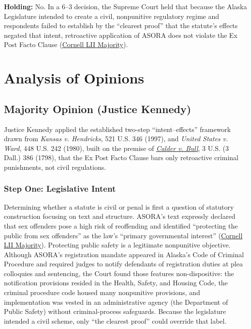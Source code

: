 \documentclass[12pt]{article}
\begin{document}
\textbf{Holding:} No. In a 6--3 decision, the Supreme Court held that because the Alaska Legislature intended to create a civil, nonpunitive regulatory regime and respondents failed to establish by the ``clearest proof'' that the statute's effects negated that intent, retroactive application of ASORA does not violate the Ex Post Facto Clause (\href{https://www.law.cornell.edu/supct/html/01-729.ZO.html}{Cornell LII Majority}).

\section{Analysis of Opinions}
\subsection{Majority Opinion (Justice Kennedy)}

Justice Kennedy applied the established two-step ``intent--effects'' framework drawn from \textit{Kansas v. Hendricks}, 521 U.S. 346 (1997), and \textit{United States v. Ward}, 448 U.S. 242 (1980), built on the premise of \href{https://supreme.justia.com/cases/federal/us/3/386/}{\textit{Calder v. Bull}}, 3 U.S. (3 Dall.) 386 (1798), that the Ex Post Facto Clause bars only retroactive criminal punishments, not civil regulations.

\subsubsection{Step One: Legislative Intent}

Determining whether a statute is civil or penal is first a question of statutory construction focusing on text and structure. ASORA's text expressly declared that sex offenders pose a high risk of reoffending and identified ``protecting the public from sex offenders'' as the law's ``primary governmental interest'' (\href{https://www.law.cornell.edu/supct/html/01-729.ZO.html}{Cornell LII Majority}). Protecting public safety is a legitimate nonpunitive objective. Although ASORA's registration mandate appeared in Alaska's Code of Criminal Procedure and required judges to notify defendants of registration duties at plea colloquies and sentencing, the Court found those features non-dispositive: the notification provisions resided in the Health, Safety, and Housing Code, the criminal procedure code housed many nonpunitive provisions, and implementation was vested in an administrative agency (the Department of Public Safety) without criminal-process safeguards. Because the legislature intended a civil scheme, only ``the clearest proof'' could override that label.
\end{document}

